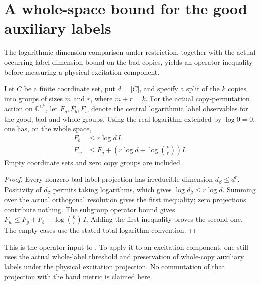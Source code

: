 \section{A whole-space bound for the good auxiliary labels}
\label{sec:good_auxiliary_label_entropy}

The logarithmic dimension comparison under restriction, together with the
actual occurring-label dimension bound on the bad copies, yields an
operator inequality before measuring a physical excitation component.

\begin{theorem}
\label{thm:good_auxiliary_label_entropy}
\leanok
Let $C$ be a finite coordinate set, put $d=|C|$, and specify a split of the
$k$ copies into groups of sizes $m$ and $r$, where $m+r=k$. For the actual
copy-permutation action on $\mathbb C^{C^k}$, let $F_g,F_b,F_w$ denote the
central logarithmic label observables for the good, bad and whole groups.
Using the real logarithm extended by $\log0=0$, one has, on the whole space,
\begin{align}
 F_b&\le r\log d\,I,\\
 F_w&\le F_g+\left(r\log d+\log\binom{k}{r}\right)I.
 \label{eq:good_auxiliary_label_entropy}
\end{align}
Empty coordinate sets and zero copy groups are included.
\end{theorem}
\begin{proof}
\leanok
Every nonzero bad-label projection has irreducible dimension
$d_\beta\le d^r$. Positivity of $d_\beta$ permits taking logarithms,
which gives $\log d_\beta\le r\log d$. Summing over the actual orthogonal
resolution gives the first inequality; zero projections contribute nothing.
The subgroup operator bound gives
$F_w\le F_g+F_b+\log\binom{k}{r}\,I$. Adding the first inequality proves
the second one. The empty cases use the stated total logarithm convention.
\end{proof}

This is the operator input to
\cite[Section~7, equation \textup{(comparator:good-auxiliary)}]{OpenAI2026AreaLaw}.
To apply it to an excitation component, one still uses the actual
whole-label threshold and preservation of whole-copy auxiliary labels
under the physical excitation projection. No commutation of that projection
with the band metric is claimed here.
